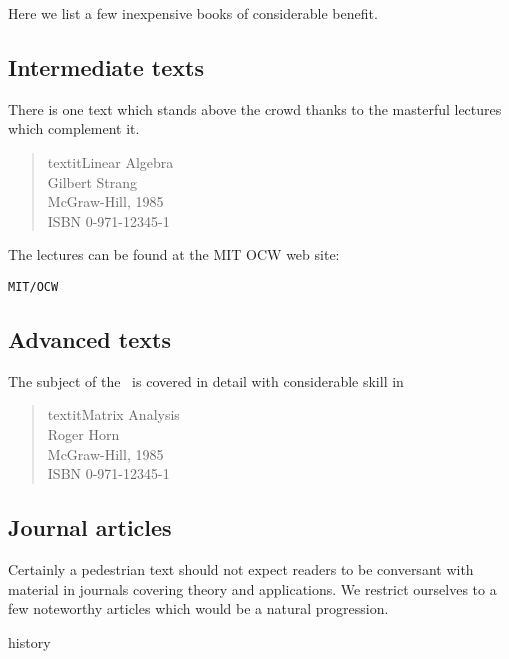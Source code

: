 Here we list a few inexpensive books of considerable benefit. 

\subsection*{Intermediate texts}
There is one text which stands above the crowd thanks to the masterful lectures which complement it.
\begin{quote}
textit{Linear Algebra}\\
Gilbert Strang\\
McGraw-Hill, 1985\\
ISBN 0-971-12345-1
\end{quote}
The lectures can be found at the MIT OCW web site:
\begin{verbatim} 
MIT/OCW
\end{verbatim}

\subsection*{Advanced texts}
The subject of the \svdl \ is covered in detail with considerable skill in
\begin{quote}
textit{Matrix Analysis}\\
Roger Horn\\
McGraw-Hill, 1985\\
ISBN 0-971-12345-1
\end{quote}

\subsection*{Journal articles}
Certainly a pedestrian text should not expect readers to be conversant with material in journals covering theory and applications. We restrict ourselves to a few noteworthy articles which would be a natural progression.

history

\endinput
